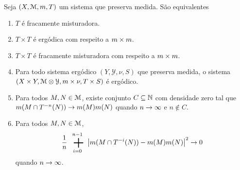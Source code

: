 \begin{theorem}
	Seja $(X,\mathcal{M},m,T)$ um sistema que preserva medida. São equivalentes
	\begin{enumerate}
	\item $T$ é fracamente misturadora.
	\item $T \times T$ é ergódica com respeito a $m \times m$.
	\item $T \times T$ é fracamente misturadora com respeito a $m \times m$.
	\item Para todo sistema ergódico $(Y,\mathcal Y,\nu,S)$ que preserva medida, o sistema $(X \times Y, \mathcal{M} \otimes \mathcal Y,m \times \nu,T \times S)$ é ergódico.
	\item Para todos $M,N \in \mathcal{M}$, existe conjunto $C \subseteq \mathbb{N}$ com densidade zero tal que $m(M \cap T^{-n}(N)) \rightarrow m(M)m(N)$ quando $n \rightarrow \infty$ e $n \notin C$.
	\item Para todos $M,N \in \mathcal{M}$,
		\begin{equation*}
		\frac{1}{n}\sum_{i=0}^{n-1} \left|\med(M \cap T^{-i}(N)) - \med(M)\med(N)\right|^2 \conv 0
		\end{equation*}
quando $n \rightarrow \infty$.
	\end{enumerate}
\end{theorem}
